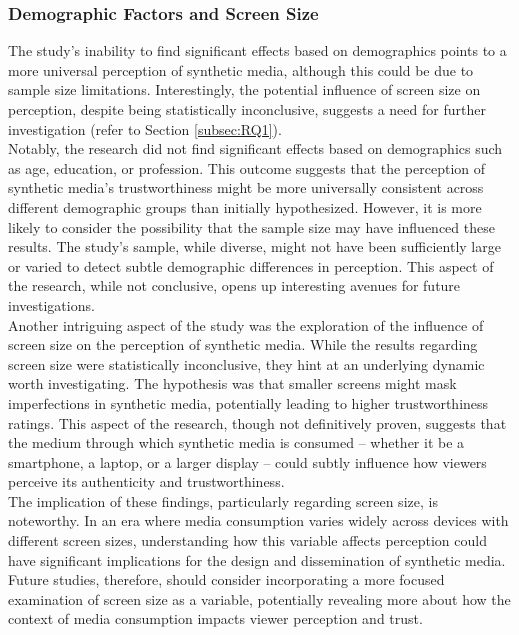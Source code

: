 \documentclass[
  a4paper,  %
  twoside,  %
  bibliography=totoc,
  headsepline,
  cleardoublepage=empty,
  parskip=half,
  draft=false
]{scrbook}
\begin{document}
\subsubsection{Demographic Factors and Screen Size}
The study's inability to find significant effects based on demographics points to a more universal perception of synthetic media, although this could be due to sample size limitations. Interestingly, the potential influence of screen size on perception, despite being statistically inconclusive, suggests a need for further investigation (refer to Section \ref{subsec:RQ1}). \\
Notably, the research did not find significant effects based on demographics such as age, education, or profession. This outcome suggests that the perception of synthetic media's trustworthiness might be more universally consistent across different demographic groups than initially hypothesized. However, it is more likely to consider the possibility that the sample size may have influenced these results. The study's sample, while diverse, might not have been sufficiently large or varied to detect subtle demographic differences in perception. This aspect of the research, while not conclusive, opens up interesting avenues for future investigations. \\
Another intriguing aspect of the study was the exploration of the influence of screen size on the perception of synthetic media. While the results regarding screen size were statistically inconclusive, they hint at an underlying dynamic worth investigating. The hypothesis was that smaller screens might mask imperfections in synthetic media, potentially leading to higher trustworthiness ratings. This aspect of the research, though not definitively proven, suggests that the medium through which synthetic media is consumed – whether it be a smartphone, a laptop, or a larger display – could subtly influence how viewers perceive its authenticity and trustworthiness. \\
The implication of these findings, particularly regarding screen size, is noteworthy. In an era where media consumption varies widely across devices with different screen sizes, understanding how this variable affects perception could have significant implications for the design and dissemination of synthetic media. Future studies, therefore, should consider incorporating a more focused examination of screen size as a variable, potentially revealing more about how the context of media consumption impacts viewer perception and trust.
\end{document}
